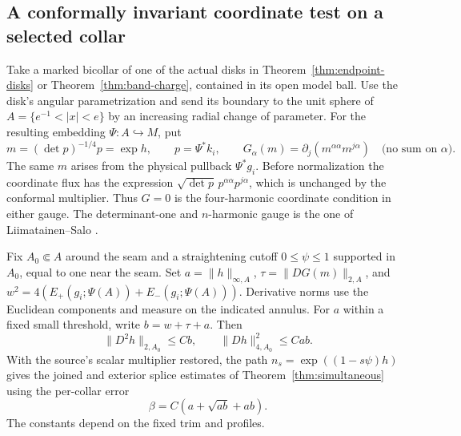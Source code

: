 \subsection{A conformally invariant coordinate test on a selected collar}
\label{sec:disk-collar-comparison}

Take a marked bicollar of one of the actual disks in
Theorem~\ref{thm:endpoint-disks} or Theorem~\ref{thm:band-charge}, contained in its open model
ball. Use the disk's angular parametrization and send its
boundary to the unit sphere of \(A=\{e^{-1}<|x|<e\}\) by an
increasing radial change of parameter. For the resulting
embedding \(\Psi:A\hookrightarrow M\), put
\[
 m=(\det p)^{-1/4}p=\exp h,\qquad p=\Psi^*k_i,\qquad
 G_\alpha(m)=\partial_j(m^{\alpha\alpha}m^{j\alpha})
 \quad\text{(no sum on \(\alpha\))}.
\]
The same \(m\) arises from the physical pullback \(\Psi^*g_i\).
Before normalization the coordinate flux has the expression
\(\sqrt{\det p}\,p^{\alpha\alpha}p^{j\alpha}\), which is
unchanged by the conformal multiplier. Thus \(G=0\) is the
four-harmonic coordinate condition in either gauge. The
determinant-one and \(n\)-harmonic gauge is the one of
Liimatainen--Salo \cite[Theorem~1.1]{LiimatainenSalo2016ConformalGauge}.

\begin{proposition}
\label{prop:disk-collar-comparison}
Fix \(A_0\Subset A\) around the seam and a straightening cutoff
\(0\le\psi\le1\) supported in \(A_0\), equal to one near the
seam. Set \(a=\|h\|_{\infty,A}\), \(\tau=\|DG(m)\|_{2,A}\),
and \(w^2=4(E_+(g_i;\Psi(A))+E_-(g_i;\Psi(A)))\). Derivative
norms use the Euclidean components and measure on the indicated
annulus. For \(a\) within a fixed small threshold, write
\(b=w+\tau+a\). Then
\[
 \|D^2h\|_{2,A_0}\le Cb,\qquad
 \|Dh\|_{4,A_0}^2\le Cab .
\]
With the source's scalar multiplier restored, the path
\(n_s=\exp((1-s\psi)h)\) gives the joined and exterior
splice estimates of Theorem~\ref{thm:simultaneous} using the
per-collar error
\begin{equation}\label{eq:disk-collar-allowance}
 \beta=C(a+\sqrt{ab}+ab).
\end{equation}
The constants depend on the fixed trim and profiles.
\end{proposition}

